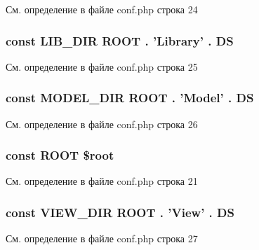 См. определение в файле conf.\-php строка 24

\hypertarget{conf_8php_aab9895f0433c9fc8f6980e22ddecbbd2}{
\subsubsection[{L\-I\-B\-\_\-\-D\-I\-R}]{\setlength{\rightskip}{0pt plus 5cm}const L\-I\-B\-\_\-\-D\-I\-R {\bf R\-O\-O\-T} . 'Library' . {\bf D\-S}}}\label{conf_8php_aab9895f0433c9fc8f6980e22ddecbbd2}


См. определение в файле conf.\-php строка 25

\hypertarget{conf_8php_af1b1241d1e4dfde50cb4cff4e42a4a06}{
\subsubsection[{M\-O\-D\-E\-L\-\_\-\-D\-I\-R}]{\setlength{\rightskip}{0pt plus 5cm}const M\-O\-D\-E\-L\-\_\-\-D\-I\-R {\bf R\-O\-O\-T} . 'Model' . {\bf D\-S}}}\label{conf_8php_af1b1241d1e4dfde50cb4cff4e42a4a06}


См. определение в файле conf.\-php строка 26

\hypertarget{conf_8php_a18c0644836e196aed6d63779e14d6bd8}{
\subsubsection[{R\-O\-O\-T}]{\setlength{\rightskip}{0pt plus 5cm}const R\-O\-O\-T \$root}}\label{conf_8php_a18c0644836e196aed6d63779e14d6bd8}


См. определение в файле conf.\-php строка 21

\hypertarget{conf_8php_ab03c61889740a358477b63e1060ed780}{
\subsubsection[{V\-I\-E\-W\-\_\-\-D\-I\-R}]{\setlength{\rightskip}{0pt plus 5cm}const V\-I\-E\-W\-\_\-\-D\-I\-R {\bf R\-O\-O\-T} . 'View' . {\bf D\-S}}}\label{conf_8php_ab03c61889740a358477b63e1060ed780}


См. определение в файле conf.\-php строка 27

